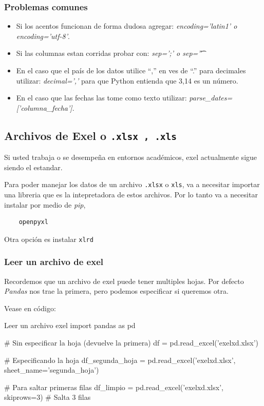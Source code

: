 \subsubsection{Problemas comunes}
\begin{itemize}
    \item Si los acentos funcionan de forma dudosa agregar: \textit{encoding='latin1' o encoding='utf-8'}.
    \item Si las columnas estan corridas probar con: \textit{sep=';' o sep='\t'}
    \item En el caso que el país de los datos utilice ``,'' en ves de ``.'' para decimales utilizar: \textit{decimal=','} para que Python entienda que 3,14 es un número.
    \item En el caso que las fechas las tome como texto utilizar: \textit{parse\_dates=['columna\_fecha']}.
\end{itemize}



\subsection{Archivos de Exel o \texttt{.xlsx , .xls}}

Si usted trabaja o se desempeña en entornos académicos, exel actualmente sigue siendo el estandar. 

Para poder manejar los datos de un archivo \texttt{.xlsx} o \texttt{xls}, va a necesitar importar una libreria que es la intepretadora de estos archivos. Por lo tanto va a necesitar instalar por medio de \textit{pip}, 
\begin{verbatim}
    openpyxl
\end{verbatim}

Otra opción es instalar \texttt{xlrd}

\subsubsection{Leer un archivo de exel}

Recordemos que un archivo de exel puede tener multiples hojas. Por defecto \textit{Pandas} nos trae la primera, pero podemos especificar si queremos otra.

Vease en código:
\begin{pycode}{Leer un archivo exel}
import pandas as pd

# Sin especificar la hoja (devuelve la primera)
df = pd.read_excel('exelxd.xlsx')

# Especificando la hoja
df_segunda_hoja = pd.read_excel('exelxd.xlsx', sheet_name='segunda_hoja')

# Para saltar primeras filas
df_limpio = pd.read_excel('exelxd.xlsx', skiprows=3) # Salta 3 filas   
\end{pycode}



